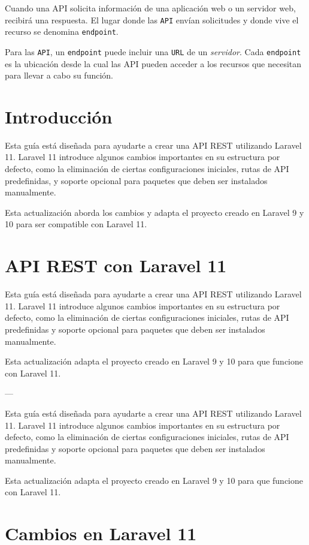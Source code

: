 \documentclass[11pt]{article}
\begin{document}
Cuando una API solicita información de una aplicación web o un
servidor web, recibirá una respuesta. El lugar donde las \texttt{API} envían
solicitudes y donde vive el recurso se denomina \texttt{endpoint}.

Para las \texttt{API}, un \texttt{endpoint} puede incluir una \texttt{URL} de un
\emph{servidor}. Cada \texttt{endpoint} es la ubicación desde la cual las API pueden
acceder a los recursos que necesitan para llevar a cabo su función.

\section{Introducción}
\label{sec:org2557565}
Esta guía está diseñada para ayudarte a crear una API REST utilizando
Laravel 11. Laravel 11 introduce algunos cambios importantes en su
estructura por defecto, como la eliminación de ciertas configuraciones
iniciales, rutas de API predefinidas, y soporte opcional para paquetes
que deben ser instalados manualmente.

Esta actualización aborda los cambios y adapta el proyecto creado en
Laravel 9 y 10 para ser compatible con Laravel 11.
\section{API REST con Laravel 11}
\label{sec:org6802bb9}

Esta guía está diseñada para ayudarte a crear una API REST utilizando Laravel 11. Laravel 11 introduce algunos cambios importantes en su estructura por defecto, como la eliminación de ciertas configuraciones iniciales, rutas de API predefinidas y soporte opcional para paquetes que deben ser instalados manualmente.

Esta actualización adapta el proyecto creado en Laravel 9 y 10 para que funcione con Laravel 11.

---

Esta guía está diseñada para ayudarte a crear una API REST utilizando Laravel 11. Laravel 11 introduce algunos cambios importantes en su estructura por defecto, como la eliminación de ciertas configuraciones iniciales, rutas de API predefinidas y soporte opcional para paquetes que deben ser instalados manualmente.

Esta actualización adapta el proyecto creado en Laravel 9 y 10 para que funcione con Laravel 11.

\section{Cambios en Laravel 11}
\label{sec:org5c6093e}
\end{document}
